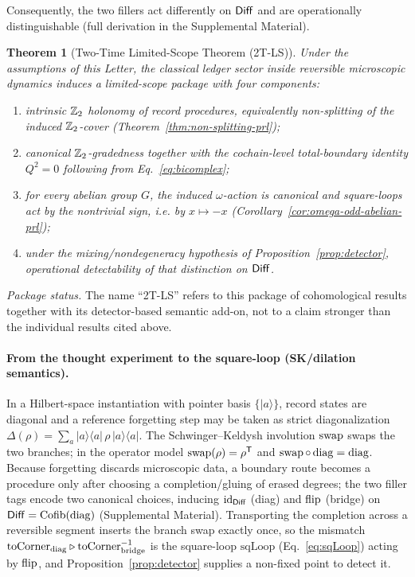 \documentclass[aps,prl,reprint,floatfix]{revtex4-2}
\theoremstyle{plain}
\newtheorem{theorem}{Theorem}
\theoremstyle{definition}
\begin{document}
\noindent
Consequently, the two fillers act differently on $\mathsf{Diff}$ and are operationally distinguishable (full derivation in the Supplemental Material).

\begin{theorem}[Two-Time Limited-Scope Theorem (2T-LS)]
\label{thm:2tls-package}
Under the assumptions of this Letter, the classical ledger sector inside reversible microscopic dynamics induces a limited-scope package with four components:
\begin{enumerate}
\item intrinsic $\mathbb{Z}_2$ holonomy of record procedures, equivalently non-splitting of the induced $\mathbb{Z}_2$-cover (Theorem~\ref{thm:non-splitting-prl});
\item canonical $\mathbb{Z}_2$-gradedness together with the cochain-level total-boundary identity $Q^2=0$ following from Eq.~\eqref{eq:bicomplex};
\item for every abelian group $G$, the induced $\omega$-action is canonical and square-loops act by the nontrivial sign, i.e. by $x\mapsto -x$ (Corollary~\ref{cor:omega-odd-abelian-prl});
\item under the mixing/nondegeneracy hypothesis of Proposition~\ref{prop:detector}, operational detectability of that distinction on $\mathsf{Diff}$.
\end{enumerate}
\end{theorem}

\noindent\emph{Package status.}
The name ``2T-LS'' refers to this package of cohomological results together with its detector-based semantic add-on, not to a claim stronger than the individual results cited above.

\paragraph{From the thought experiment to the square-loop (SK/dilation semantics).}
In a Hilbert-space instantiation with pointer basis $\{\lvert a\rangle\}$, record states are diagonal and a reference forgetting step may be taken as strict diagonalization
$\Delta(\rho)=\sum_a \lvert a\rangle\langle a\rvert\,\rho\,\lvert a\rangle\langle a\rvert$.
The Schwinger--Keldysh involution $\operatorname{swap}$ swaps the two branches; in the operator model $\operatorname{swap}(\rho)=\rho^{\mathsf T}$ and $\operatorname{swap}\circ\operatorname{diag}=\operatorname{diag}$.
Because forgetting discards microscopic data, a boundary route becomes a procedure only after choosing a completion/gluing of erased degrees; the two filler tags encode two canonical choices, inducing $\mathrm{id}_{\mathsf{Diff}}$ (diag) and $\operatorname{flip}$ (bridge) on $\mathsf{Diff}=\operatorname{Cofib}(\operatorname{diag})$ (Supplemental Material).
Transporting the completion across a reversible segment inserts the branch swap exactly once, so the mismatch $\mathrm{toCorner}_{\mathrm{diag}}\mathbin{\triangleright} \mathrm{toCorner}_{\mathrm{bridge}}^{-1}$ is the square-loop $\mathrm{sqLoop}$ (Eq.~\ref{eq:sqLoop}) acting by $\operatorname{flip}$, and Proposition~\ref{prop:detector} supplies a non-fixed point to detect it.
\end{document}
